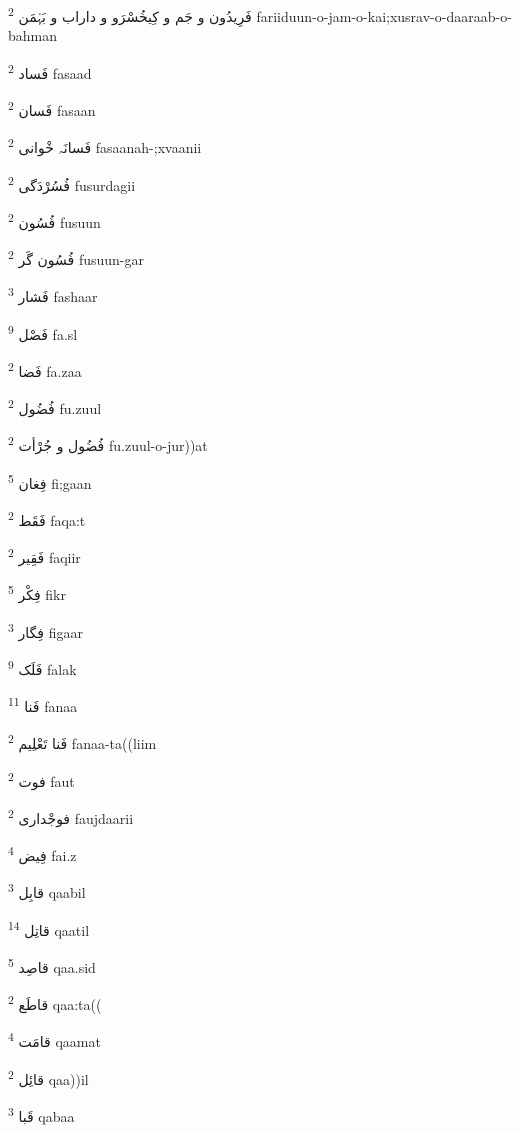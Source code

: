 \documentclass[12pt]{article}
\begin{document}
\begin{RTL}
\begin{multicols}{5}
{\ur فَرِیدُون و جَم و کِیخُسْرَو و داراب و بَہْمَن}   \textsuperscript{2} fariiduun-o-jam-o-kai;xusrav-o-daaraab-o-bahman

{\ur فَساد}   \textsuperscript{2} fasaad

{\ur فَسان}   \textsuperscript{2} fasaan

{\ur فَسانَہ خْوانی}   \textsuperscript{2} fasaanah-;xvaanii

{\ur فُسُرْدَگی}   \textsuperscript{2} fusurdagii

{\ur فُسُون}   \textsuperscript{2} fusuun

{\ur فُسُون گَر}   \textsuperscript{2} fusuun-gar

{\ur فَشار}   \textsuperscript{3} fashaar

{\ur فَصْل}   \textsuperscript{9} fa.sl

{\ur فَضا}   \textsuperscript{2} fa.zaa

{\ur فُضُول}   \textsuperscript{2} fu.zuul

{\ur فُضُول و جُرْأت}   \textsuperscript{2} fu.zuul-o-jur))at

{\ur فِغان}   \textsuperscript{5} fi;gaan

{\ur فَقَط}   \textsuperscript{2} faqa:t

{\ur فَقِیر}   \textsuperscript{2} faqiir

{\ur فِکْر}   \textsuperscript{5} fikr

{\ur فِگار}   \textsuperscript{3} figaar

{\ur فَلَک}   \textsuperscript{9} falak

{\ur فَنا}   \textsuperscript{11} fanaa

{\ur فَنا تَعْلِیم}   \textsuperscript{2} fanaa-ta((liim

{\ur فوت}   \textsuperscript{2} faut

{\ur فوجْداری}   \textsuperscript{2} faujdaarii

{\ur فِیض}   \textsuperscript{4} fai.z

{\ur قابِل}   \textsuperscript{3} qaabil

{\ur قاتِل}   \textsuperscript{14} qaatil

{\ur قاصِد}   \textsuperscript{5} qaa.sid

{\ur قاطَع}   \textsuperscript{2} qaa:ta((

{\ur قامَت}   \textsuperscript{4} qaamat

{\ur قائِل}   \textsuperscript{2} qaa))il

{\ur قَبا}   \textsuperscript{3} qabaa


\end{multicols}
\end{RTL}
\end{document}
